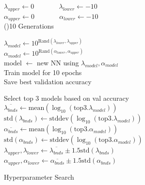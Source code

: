 \documentclass{article}
\begin{document}
\renewcommand{\thealgocf}{3.2.0}
\begin{figure}
    \centering
    \begin{minipage}{0.5\textwidth}
        \centering
    \begin{algorithm}[H]
        \SetAlgoLined
        \caption{Hyperparameter Search}
        $\lambda_{upper}\leftarrow 0$ \ \ \ \ \ \ 
        $\lambda_{lower}\leftarrow -10$ \\
        $\alpha_{upper}\leftarrow 0$ \ \ \ \ \ \ 
        $\alpha_{lower}\leftarrow -10$ \\
        
        \For(){10 Generations}{
             {
                $\lambda_{model} \leftarrow 10^{\text{Rand}(\lambda_{lower}, \lambda_{upper})}$\\
                $\alpha_{model} \leftarrow 10^{\text{Rand}(\alpha_{lower}, \alpha_{upper})}$\\
                \vspace{10px}
                model $\leftarrow$ new NN using $\lambda_{model}, \alpha_{model}$\\
                Train model for 10 epochs \\
                Save best validation accuracy
            }
    
    
            Select top 3 models based on val accuracy\\
    
            \vspace{10px}
            $\overline{\lambda_{bnds}} \leftarrow \text{mean} (\log_{10}(\text{top3}.\lambda_{model}))$\\
            $\text{std}({\lambda_{bnds}}) \leftarrow \text{stddev} (\log_{10}(\text{top3}.\lambda_{model}))$\\
            \vspace{10px}
            $\overline{\alpha_{bnds}} \leftarrow \text{mean} (\log_{10}(\text{top3}.\alpha_{model}))$\\
            $\text{std}({\alpha_{bnds}}) \leftarrow \text{stddev} (\log_{10}(\text{top3}.\alpha_{model}))$\\
    
            \vspace{10px}
            $\lambda_{upper}, \lambda_{lower} \leftarrow \overline{\lambda_{bnds}} \pm 1.5\text{std}(\lambda_{bnds})$\\
            $\alpha_{upper}, \alpha_{lower} \leftarrow \overline{\alpha_{bnds}} \pm 1.5\text{std}(\alpha_{bnds})$
        
}
\end{algorithm}
\end{minipage}
\end{figure}
\end{document}
